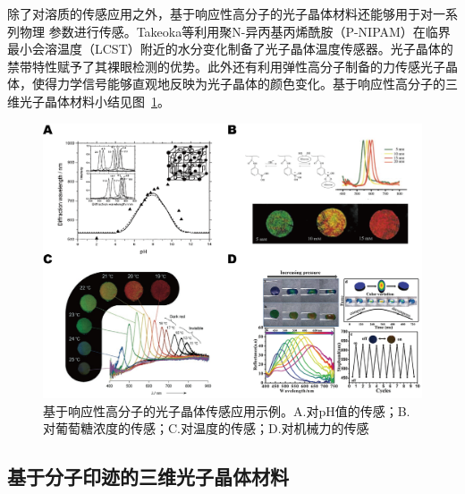 除了对溶质的传感应用之外，基于响应性高分子的光子晶体材料还能够用于对一系列物理
参数进行传感。Takeoka等利用聚N-异丙基丙烯酰胺（P-NIPAM）在临界最小会溶温度（LCST）附近的水分变化制备了光子晶体温度传感器\cite{Takeoka2002Polymer,Matsubara2007Thermally}。光子晶体的禁带特性赋予了其裸眼检测的优势。此外还有利用弹性高分子制备的力传感光子晶体\cite{Wang2014Robust,Scheid2014Redox}，使得力学信号能够直观地反映为光子晶体的颜色变化。基于响应性高分子的三维光子晶体材料小结见图~\ref{fig:responsive_phC}。
\begin{figure}[htbp]
	\centering
	\includegraphics[width=0.8\linewidth]{figures/responsive-pol-PhC.png}
	\caption{基于响应性高分子的光子晶体传感应用示例。A.对pH值的传感\cite{Lee2000Photonic}；B.对葡萄糖浓度的传感\cite{Honda2009Confined}；C.对温度的传感\cite{Matsubara2007Thermally}；D.对机械力的传感\cite{Wang2014Robust}}
	\label{fig:responsive_phC}
\end{figure}

\subsection{基于分子印迹的三维光子晶体材料}
\label{subsec:mol-imprint}


